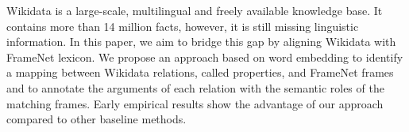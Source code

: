 Wikidata is a large-scale, multilingual and freely available knowledge base. It contains more than 14 million facts, however, it is still missing linguistic information. In this paper, we aim to bridge this gap by aligning Wikidata with FrameNet lexicon. We propose an approach based on word embedding to identify a mapping between Wikidata relations, called properties, and FrameNet frames and to annotate the arguments of each relation with the semantic roles of the matching frames. Early empirical results show the advantage of our approach compared to other baseline methods.
